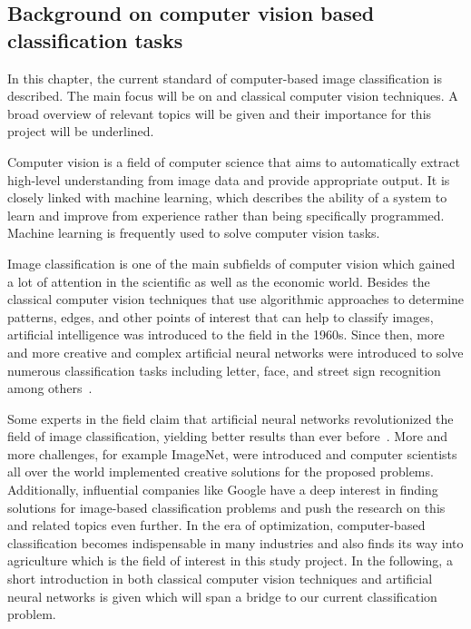 \subsection{Background on computer vision based classification tasks}
\label{sec:BackgroundCV}

In this chapter, the current standard of computer-based image classification is described. The main focus will be on  and classical computer vision techniques. A broad overview of relevant topics will be given and their importance for this project will be underlined.

Computer vision is a field of computer science that aims to automatically extract high-level understanding from image data and provide appropriate output. It is closely linked with machine learning, which describes the ability of a system to learn and improve from experience rather than being specifically programmed. Machine learning is frequently used to solve computer vision tasks.

\bigskip
Image classification is one of the main subfields of computer vision which gained a lot of attention in the scientific as well as the economic world. Besides the classical computer vision techniques that use algorithmic approaches to determine patterns, edges, and other points of interest that can help to classify images, artificial intelligence was introduced to the field in the 1960s. Since then, more and more creative and complex artificial neural networks were introduced to solve numerous classification tasks including letter, face, and street sign recognition among others~\citep{mironczuk2018recent,balaban2015deep,stallkamp2011german}.

Some experts in the field claim that artificial neural networks revolutionized the field of image classification, yielding better results than ever before~\citep{he2016deep,alexnet2012original}. More and more challenges, for example ImageNet, were introduced and computer scientists all over the world implemented creative solutions for the proposed problems. Additionally, influential companies like Google have a deep interest in finding solutions for image-based classification problems and push the research on this and related topics even further. In the era of optimization, computer-based classification becomes indispensable in many industries and also finds its way into agriculture which is the field of interest in this study project.
In the following, a short introduction in both classical computer vision techniques and artificial neural networks is given which will span a bridge to our current classification problem.

